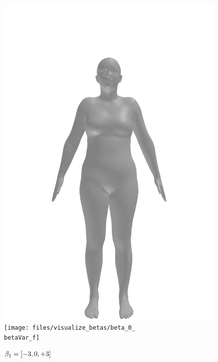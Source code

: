 \begin{figure}[ht!]
\begin{minipage}[b]{\textwidth}
        \includegraphics[width=\imgWidth]{files/visualize_betas/baseline_f}
        \texttt{[image: files/visualize\_betas/beta\_0\_\\betaVar\_f]}
        \caption[Effect of varying $\beta_1$ in SMPL]{$\beta_1 = [-3, 0, +3]$}
        \label{fig:beta-1-vis}
    \end{minipage}
\end{figure}

